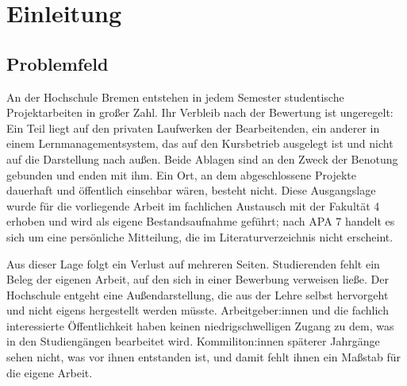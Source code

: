 %
%
%

\chapter{Einleitung}
\label{kap:einleitung}

\section{Problemfeld}
\label{sec:problemfeld}

An der Hochschule Bremen entstehen in jedem Semester studentische Projektarbeiten in großer Zahl. Ihr Verbleib nach der Bewertung ist ungeregelt: Ein Teil liegt auf den privaten Laufwerken der Bearbeitenden, ein anderer in einem Lernmanagementsystem, das auf den Kursbetrieb ausgelegt ist und nicht auf die Darstellung nach außen. Beide Ablagen sind an den Zweck der Benotung gebunden und enden mit ihm. Ein Ort, an dem abgeschlossene Projekte dauerhaft und öffentlich einsehbar wären, besteht nicht. Diese Ausgangslage wurde für die vorliegende Arbeit im fachlichen Austausch mit der Fakultät 4 erhoben und wird als eigene Bestandsaufnahme geführt; nach APA 7 handelt es sich um eine persönliche Mitteilung, die im Literaturverzeichnis nicht erscheint.

Aus dieser Lage folgt ein Verlust auf mehreren Seiten. Studierenden fehlt ein Beleg der eigenen Arbeit, auf den sich in einer Bewerbung verweisen ließe. Der Hochschule entgeht eine Außendarstellung, die aus der Lehre selbst hervorgeht und nicht eigens hergestellt werden müsste. Arbeitgeber:innen und die fachlich interessierte Öffentlichkeit haben keinen niedrigschwelligen Zugang zu dem, was in den Studiengängen bearbeitet wird. Kommiliton:innen späterer Jahrgänge sehen nicht, was vor ihnen entstanden ist, und damit fehlt ihnen ein Maßstab für die eigene Arbeit.

